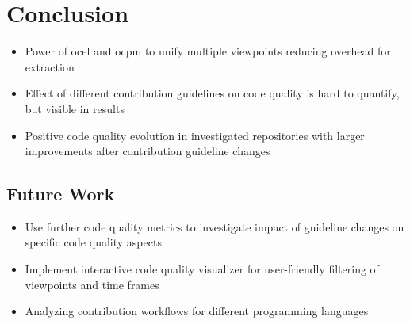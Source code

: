 \chapter{Conclusion}
\label{chap:conclusion}
\begin{itemize}
	\item Power of \ac{ocel} and \ac{ocpm} to unify multiple viewpoints reducing overhead for extraction
	\item Effect of different contribution guidelines on code quality is hard to quantify, but visible in results
	\item Positive code quality evolution in investigated repositories with larger improvements after contribution guideline changes
\end{itemize}

\section{Future Work}
\begin{itemize}
	\item Use further code quality metrics to investigate impact of guideline changes on specific code quality aspects
	\item Implement interactive code quality visualizer for user-friendly filtering of viewpoints and time frames
	\item Analyzing contribution workflows for different programming languages
\end{itemize}
